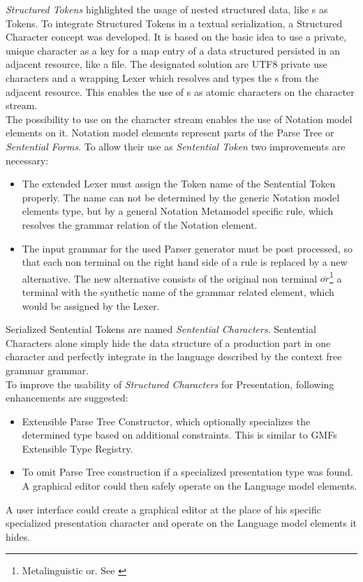 \emph{Structured Tokens} highlighted the usage of nested structured data, like s as Tokens. To integrate Structured Tokens in a textual serialization, a Structured Character concept was developed. It is based on the basic idea to use a private, unique character as a key for a map entry of a data structured persisted in an adjacent resource, like a file. The designated solution are UTF8 private use characters and a wrapping Lexer which resolves and types the s from the adjacent resource. This enables the use of s as atomic characters on the character stream. \\

The possibility to use  on the character stream enables the use of Notation model elements on it. Notation model elements represent parts of the Parse Tree or \emph{Sentential Forms}. To allow their use as \emph{Sentential Token} two improvements are necessary:
\begin{itemize}
	\item The extended Lexer must assign the Token name of the Sentential Token properly. The name can not be determined by the generic Notation model elements type, but by a general Notation Metamodel specific rule, which resolves the grammar relation of the Notation element.
	\item The input grammar for the used Parser generator must be post processed, so that each non terminal on the right hand side of a rule is replaced by a new alternative. The new alternative consists of the original non terminal $\overline{or}$\footnote{\raggedright Metalinguistic or. See \cite{BNF}} a terminal with the synthetic name of the grammar related element, which would be assigned by the Lexer.
\end{itemize}
Serialized Sentential Tokens are named \emph{Sentential Characters}. Sentential Characters alone simply hide the data structure of a production part in one character and perfectly integrate in the language described by the context free grammar grammar. \\

To improve the usability of \emph{Structured Characters} for Presentation, following enhancements are suggested:
\begin{itemize}
	\item Extensible Parse Tree Constructor, which optionally specializes the determined type based on additional constraints. This is similar to GMFs Extensible Type Registry.
	\item To omit Parse Tree construction if a specialized presentation type was found. A graphical editor could then safely operate on the Language model elements.
\end{itemize}
A user interface could create a graphical editor at the place of his specific specialized presentation character and operate on the Language model elements it hides.\\


